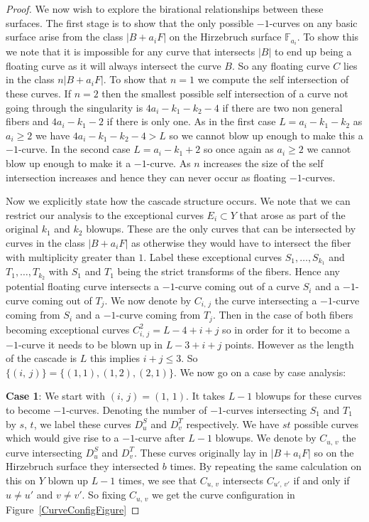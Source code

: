 \documentclass[12pt,a4paper]{book}      %
\theoremstyle{definition}
\newcommand{\mb}[1]{\mathbb{#1}}
\begin{document}
\begin{proof}
We now wish to explore the birational relationships between these surfaces. The first stage is to show that the only possible $-1$-curves on any basic surface arise from the class $|B+ a_i F|$ on the Hirzebruch surface $\mb{F}_{a_i}$. To show this we note that it is impossible for any curve that intersects $|B|$ to end up being a floating curve as it will always intersect the curve $B$. So any floating curve $C$ lies in the class $n|B+a_i F|$. To show that $n=1$ we compute the self intersection of these curves. If $n=2$ then the smallest possible self intersection of a curve not going through the singularity  is $4a_i - k_1 - k_2 - 4$ if there are two non general fibers and $4a_i - k_1 -2$ if there is only one. As in the first case $L = a_i- k_1-k_2$ as $a_i \geq 2 $  we have $4a_i -k_1-k_2 - 4 > L$ so we cannot blow up enough to make this a $-1$-curve. In the second case $L = a_i -k_1+2$ so once again as $a_i \geq 2$  we cannot blow up enough to make it a $-1$-curve. As $n$ increases the size of the self intersection increases and hence they can never occur as floating $-1$-curves.


Now we explicitly state how the cascade structure occurs. We note that we can restrict our analysis to the exceptional curves $E_i \subset Y$ that arose as part of the original $k_1$ and $k_2$ blowups. These are the only curves that can be intersected by curves in the class $|B + a_i F|$ as otherwise they would have to intersect the fiber with multiplicity greater than $1$. Label these exceptional curves $S_1, \dots ,S_{k_1}$ and $T_1, \dots , T_{k_2}$ with $S_{1}$ and $T_{1}$ being the strict transforms of the fibers. Hence any potential floating curve intersects a $-1$-curve coming out of a curve $S_i$ and a $-1$-curve coming out of $T_j$. We now denote by $C_{i,\, j}$ the curve intersecting a $-1$-curve coming from $S_i$ and a $-1$-curve coming from $T_j$. Then in the case of both fibers becoming exceptional curves $C_{i, \, j}^2 = L- 4 + i + j$ so in order for it to become a $-1$-curve it needs to be blown up in $L - 3 + i + j$ points. However as the length of the cascade is $L$ this implies $i+j \leq 3$. So $\{ (i, \, j) \} = \{(1,1), (1,2), (2,1) \} $. We now go on a case by case analysis:


\textbf{Case 1}: We start with $(i, \, j)  = (1,\, 1)$. It takes $L - 1$ blowups for these curves to become $-1$-curves. Denoting the number of $-1$-curves intersecting $S_1$ and $T_1$ by $s, \, t$, we label these curves $D_u^S$ and $D_v^T$ respectively. We have $st$ possible curves which would give rise to a $-1$-curve after $L-1$ blowups. We denote by $C_{u, \, v}$ the curve intersecting $D_u^S$ and $D_v^T$. These curves originally lay in $|B+ a_i F|$ so on the Hirzebruch surface they intersected $b$ times. By repeating the same calculation on  this on $Y$ blown up $L-1$ times, we see that $C_{u,\, v}$ intersects $C_{u' , \, v'}$ if and only if $u \neq u'$ and $v \neq v'$. So fixing $C_{u, \, v}$ we get the curve configuration in Figure~\ref{CurveConfigFigure}


\end{proof}
\end{document}
